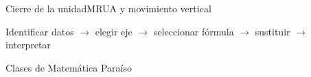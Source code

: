 \documentclass[aspectratio=169,10pt]{beamer}
\begin{document}
\begin{frame}{Cierre de la unidad}\centering\Huge\color{azul}MRUA y movimiento vertical\par\bigskip\normalsize\color{black}Identificar datos $\rightarrow$ elegir eje $\rightarrow$ seleccionar fórmula $\rightarrow$ sustituir $\rightarrow$ interpretar\par\bigskip\color{verde}\large Clases de Matemática Paraíso\end{frame}
\end{document}
